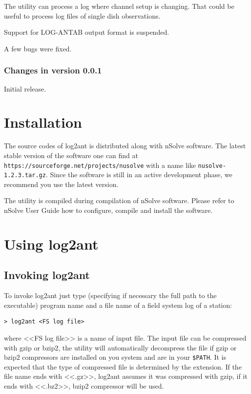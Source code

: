 \documentclass [10pt,letterpaper]{report}
\newcommand{\nuSolve}{\greektext n\latintext Solve}
\begin{document}
The utility can process a log where channel setup is changing. That could be useful
to process log files of single dish observations.

Support for LOG-ANTAB output format is suspended.

A few bugs were fixed.

\subsection{Changes in version 0.0.1}
Initial release.


%
%
\chapter{Installation}

The source codes of log2ant is distributed along with \nuSolve{}
software. The latest stable version of the software one can find at
{\tt https://sourceforge.net/projects/nusolve} with a name like
{\tt nusolve-1.2.3.tar.gz}. Since the software is still in an active
development phase, we recommend you use the latest version.

The utility is compiled during compilation of \nuSolve{} software. Please
refer to \nuSolve{} User Guide how to configure, compile and install the
software.




%
%
\chapter{Using log2ant}
\section{Invoking log2ant}
\label{section_invokation}
To invoke log2ant just type (specifying if necessary the full path
to the executable) program name and a file name of a field system log of a station:
\begin{verbatim}
> log2ant <FS log file>
\end{verbatim}
\noindent
where <<FS log file>> is a name of input file. The input file can be compressed with
gzip or bzip2, the utility will automatically decompress the file if gzip or bzip2
compressors are installed on you system and are in your {\tt \$PATH}. It is expected
that the type of compressed file is determined by the extension. If the file name
ends with <<.gz>>, log2ant assumes it was compressed with gzip, if it ends with
<<.bz2>>, bzip2 compressor will be used.
\end{document}
